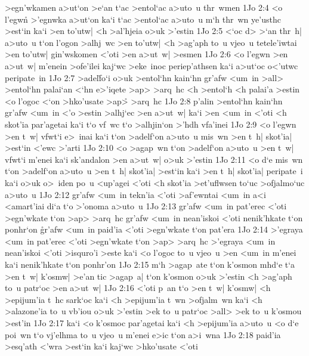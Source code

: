 >egn'wkamen
a>ut`on
>e`an
t`ac
>entol`ac
a>uto~u
thr~wmen\bibvsend
\vs 1Jo 2:4
<o
l'egw\r{n}
>'egnwka
a>ut`on
ka`i
t`ac
>entol`ac
a>uto~u
m`h
thr~wn
ye'usthc
>est`in
ka`i
>en
to'utw|
<h
>al'hjeia
o>uk
>'estin\bibvsend
\vs 1Jo 2:5
<`oc
d>
>`an
thr~h|
a>uto~u
t`on
l'ogon
>alhj~wc
>en
to'utw|
<h
>ag'aph
to~u
vjeo~u
tetele'iwtai
>en
to'utw|
gin'wskomen
<'oti
>en
a>ut~w|
>esmen\bibvsend
\vs 1Jo 2:6
<o
l'egwn
>en
a>ut~w|
m'enein
>ofe'ilei
kaj`wc
>eke~inoc
periep'athsen
ka`i
a>ut`oc
o<'utwc
peripate~in\bibvsend
\vs 1Jo 2:7
>adel\r{f}o`i
o>uk
>entol`hn
kain`hn
gr'afw
<um~in
>all>
>entol`hn
palai`an
<`hn
e>'iqete
>ap>
>arq~hc
<h
>entol`h
<h
palai'a
>estin
<o
l'ogoc
<`on
>hko'usate
>ap>\r{}
>arq~hc\bibvsend
\vs 1Jo 2:8
p'alin
>entol`hn
kain`hn
gr'afw
<um~in
<'o
>estin
>alhj`ec
>en
a>ut~w|
ka`i
>en
<um~in
<'oti
<h
skot'ia
par'agetai
ka`i
t`o
vf~wc
t`o
>alhjin`on
>'hdh
vfa'inei\bibvsend
\vs 1Jo 2:9
<o
l'egwn
>en
t~w|
vfwt`i
e>~inai
ka`i
t`on
>adelf`on
a>uto~u
mis~wn
>en
t~h|
skot'ia|
>est`in
<'ewc
>'arti\bibvsend
\vs 1Jo 2:10
<o
>agap~wn
t`on
>adelf`on
a>uto~u
>en
t~w|
vfwt`i
m'enei
ka`i
sk'andalon
>en
a>ut~w|
o>uk
>'estin\bibvsend
\vs 1Jo 2:11
<o
d`e
mis~wn
t`on
>adelf`on
a>uto~u
>en
t~h|
skot'ia|
>est`in
ka`i
>en
t~h|
skot'ia|
peripate~i
ka`i
o>uk
o>~iden
po~u
<up'agei
<'oti
<h
skot'ia
>et'uflwsen
to`uc
>ofjalmo`uc
a>uto~u\bibvsend
\vs 1Jo 2:12
gr'afw
<um~in
tekn'ia
<'oti
>af'ewntai
<um~in
a<i
<amart'iai
di`a
t`o
>'onoma
a>uto~u\bibvsend
\vs 1Jo 2:13
gr'afw
<um~in
pat'erec
<'oti
>egn'wkate
t`on
>ap>
>arq~hc
gr'afw
<um~in
nean'iskoi
<'oti
nenik'hkate
t`on
ponhr`on
\r{g}r'afw
<um~in
paid'ia
<'oti
>egn'wkate
t`on
pat'era\bibvsend
\vs 1Jo 2:14
>'egraya
<um~in
pat'erec
<'oti
>egn'wkate
t`on
>ap>
>arq~hc
>'egraya
<um~in
nean'iskoi
<'oti
>isquro'i
>este
ka`i
<o
l'ogoc
to~u
vjeo~u
>en
<um~in
m'enei
ka`i
nenik'hkate
t`on
ponhr'on\bibvsend
\vs 1Jo 2:15
m`h
>agap~ate
t`on
k'osmon
mhd`e
t`a
>en
t~w|
k'osmw|
>e'an
tic
>agap~a|
t`on
k'osmon
o>uk
>'estin
<h
>ag'aph
to~u
patr`oc
>en
a>ut~w|\bibvsend
\vs 1Jo 2:16
<'oti
p~an
t`o
>en
t~w|
k'osmw|
<h
>epijum'ia
t~hc
sark`oc
ka`i
<h
>epijum'ia
t~wn
>ofjalm~wn
ka`i
<h
>alazone'ia
to~u
vb'iou
o>uk
>'estin
>ek
to~u
patr`oc
>all>
>ek
to~u
k'osmou
>est'in\bibvsend
\vs 1Jo 2:17
ka`i
<o
k'osmoc
par'agetai
ka`i
<h
>epijum'ia
a>uto~u
<o
d`e
poi~wn
t`o
vj'elhma
to~u
vjeo~u
m'enei
e>ic
t`on
a>i~wna\bibvsend
\vs 1Jo 2:18
paid'ia
>esq'ath
<'wra
>est`in
ka`i
kaj`wc
>hko'usate
<'oti

